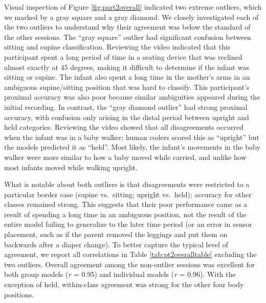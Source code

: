 \documentclass[
  man]{apa6}
\begin{document}
Visual inspection of Figure \ref{fig:part2overall} indicated two extreme outliers, which we marked by a gray square and a gray diamond. We closely investigated each of the two outliers to understand why their agreement was below the standard of the other sessions. The ``gray square'' outlier had significant confusion between sitting and supine classification. Reviewing the video indicated that this participant spent a long period of time in a seating device that was reclined almost exactly at 45 degrees, making it difficult to determine if the infant was sitting or supine. The infant also spent a long time in the mother's arms in an ambiguous supine/sitting position that was hard to classify. This participant's proximal accuracy was also poor because similar ambiguities appeared during the initial recording. In contrast, the ``gray diamond outlier'' had strong proximal accuracy, with confusion only arising in the distal period between upright and held categories. Reviewing the video showed that all disagreements occurred when the infant was in a baby walker; human coders scored this as ``upright'' but the models predicted it as ``held''. Most likely, the infant's movements in the baby walker were more similar to how a baby moved while carried, and unlike how most infants moved while walking upright.

What is notable about both outliers is that disagreements were restricted to a particular border case (supine vs.~sitting; upright vs.~held); accuracy for other classes remained strong. This suggests that their poor performance came as a result of spending a long time in an ambiguous position, not the result of the entire model failing to generalize to the later time period (or an error in sensor placement, such as if the parent removed the leggings and put them on backwards after a diaper change). To better capture the typical level of agreement, we report all correlations in Table \ref{tab:pt2overalltable} excluding the two outliers. Overall agreement among the non-outlier sessions was excellent for both group models (\emph{r} = 0.95) and individual models (\emph{r} = 0.96). With the exception of held, within-class agreement was strong for the other four body positions.
\end{document}
